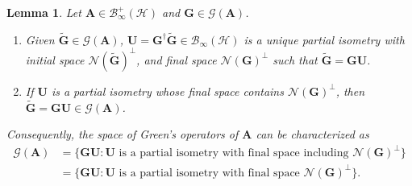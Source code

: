 \documentclass[noinfoline]{imsart}\setcounter{tocdepth}{2}
\newcommand{\m}[1]{\mathbf{#1}} %
\renewcommand{\c}[1]{\mathcal{#1}} %
\theoremstyle{plain}
\newtheorem{lemma}[theorem]{Lemma}
\begin{document}
\begin{lemma}\label{lem:Green's:part:iso}
Let $\m{A} \in \c{B}_{\infty}^{+}(\c{H})$ and $\m{G} \in \c{G}(\m{A})$. 
\begin{enumerate}[leftmargin = *]
\item Given $\tilde{\m{G}} \in \c{G}(\m{A})$, $\m{U} = \m{G}^{\dagger} \tilde{\m{G}} \in \c{B}_{\infty}(\c{H})$ is a unique partial isometry  with initial space $\c{N}(\tilde{\m{G}})^{\perp}$, and final space $\c{N}(\m{G})^{\perp}$ such that $\tilde{\m{G}} = \m{G} \m{U}$.
\item If $\m{U}$ is a partial isometry whose final space contains $\c{N}(\m{G})^{\perp}$, then $\tilde{\m{G}} = \m{G} \m{U} \in \c{G}(\m{A})$.
\end{enumerate}
Consequently, the space of Green's operators of $\m{A}$ can be characterized as
\begin{align*}
    \c{G}(\m{A}) &= \{ \m{G} \m{U} : \m{U} \text{ is a partial isometry with final space including } \c{N}(\m{G})^{\perp} \} \\
    &= \{ \m{G} \m{U} : \m{U} \text{ is a partial isometry with final space } \c{N}(\m{G})^{\perp} \}.
\end{align*}
\end{lemma}
\end{document}
